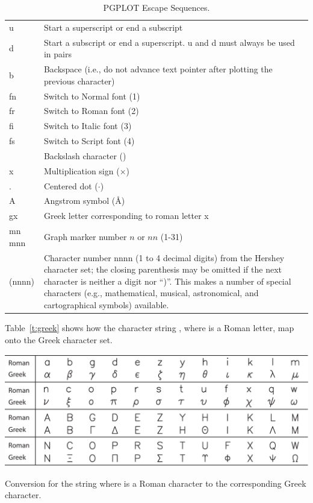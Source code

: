 \begin{table}
\begin{tabular}{ll} \toprule
{\B}u       & Start a superscript or end a subscript \\[0.5ex]
{\B}d       & Start a subscript or end a superscript.
              {\B}u and {\B}d must always be used in pairs \\[0.5ex]
{\B}b       & Backspace (i.e., do not advance text pointer  
               after plotting the previous character) \\[0.5ex]
{\B}fn      & Switch to Normal font (1)       \\[0.5ex]
{\B}fr      & Switch to Roman font (2)        \\[0.5ex]
{\B}fi      & Switch to Italic font (3)       \\[0.5ex]
{\B}fs      & Switch to Script font (4)       \\[0.5ex]
{\B}{\B}    & Backslash character (\B)        \\[0.5ex]
{\B}x       & Multiplication sign ($\times$)  \\[0.5ex]
{\B}.       & Centered dot ($\cdot$)          \\[0.5ex]
{\B}A       & Angstrom symbol (\AA)         \\[0.5ex]
{\B}gx      & Greek letter corresponding to roman letter x \\[0.5ex]
{\B}mn {\B}mnn & Graph marker number $n$ or $nn$ (1-31) \\[1ex]
{\B}(nnnn)  & 
\parbox{4.8in}{ Character number nnnn (1 to 4 decimal digits) from the
Hershey character set; the closing parenthesis may be omitted if the
next character is neither a digit nor ``)''. This makes a number of
special characters (e.g., mathematical, musical, astronomical, and
cartographical symbols) available.} \\ \bottomrule
\end{tabular}
\caption{PGPLOT Escape Sequences.}
\label{t:pgplot.escape}
\end{table}

Table~\ref{t:greek} shows how the character string , where  
is a Roman letter, map onto the Greek character set.
\begin{table}
  \centering
  \includegraphics[width=5.5in]{greek.pdf}
  \caption[Roman to Greek Character Conversion]{Conversion for the string 
 where  is a Roman character to the corresponding 
Greek character.}
\label{t:greek}
\end{table}


